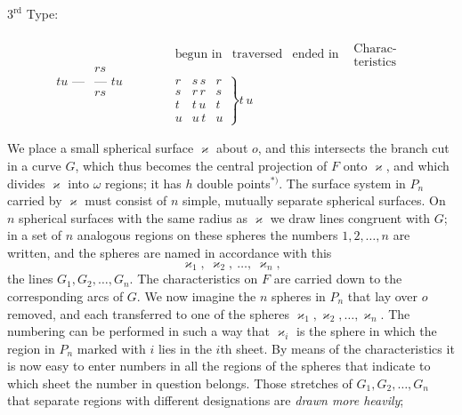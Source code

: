 \documentclass{article}
\begin{document}
\begin{center}
$3^{\text{rd}}$ Type:
\end{center}
\[
\begin{array}{c|c}
& rs \\
tu\text{ ---} & \text{--- } tu \\
& rs
\end{array}
\qquad\quad
\begin{array}{c}
\begin{array}{cccc}
\text{begun in} & \text{traversed} & \text{ended in} & \begin{array}{c}\text{Charac-}\\\text{teristics}\end{array}
\end{array} \\
\left.
\begin{array}{ccc}
r & s\,s & r \\
s & r\,r & s \\
t & t\,u & t \\
u & u\,t & u
\end{array}
\right\} t\,u
\end{array}
\]

We place a small spherical surface $\varkappa$ about $o$, and this intersects the branch cut in a curve $G$, which thus becomes the central projection of $F$ onto $\varkappa$, and which divides $\varkappa$ into $\omega$ regions; it has $h$ double points${}^{*)}$. The surface system in $P_n$ carried by $\varkappa$ must consist of $n$ simple, mutually separate spherical surfaces. On $n$ spherical surfaces with the same radius as $\varkappa$ we draw lines congruent with $G$; in a set of $n$ analogous regions on these spheres the numbers $1, 2, \dots, n$ are written, and the spheres are named in accordance with this
\[
\varkappa_1, \ \varkappa_2, \ \dots, \ \varkappa_n,
\]
the lines $G_1, G_2, \dots, G_n$. The characteristics on $F$ are carried down to the corresponding arcs of $G$. We now imagine the $n$ spheres in $P_n$ that lay over $o$ removed, and each transferred to one of the spheres $\varkappa_1, \varkappa_2, \dots, \varkappa_n$. The numbering can be performed in such a way that $\varkappa_i$ is the sphere in which the region in $P_n$ marked with $i$ lies in the $i$th sheet. By means of the characteristics it is now easy to enter numbers in all the regions of the spheres that indicate to which sheet the number in question belongs. Those stretches of $G_1, G_2, \dots, G_n$ that separate regions with different designations are \emph{drawn more heavily};
\end{document}
